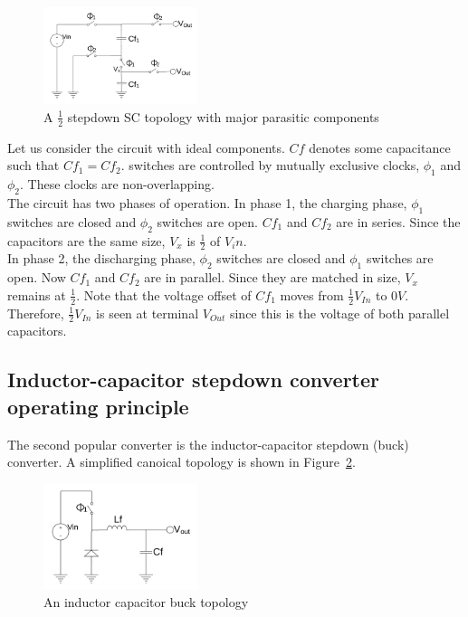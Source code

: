 \documentclass[letterpaper,twocolumn,10pt]{article}
\begin{document}
\begin{figure}[here]
\includegraphics[width=0.4\textwidth]{SCTopology}
\caption{A $\frac{1}{2}$ stepdown SC topology with major parasitic components}
\label{SCTopology}
\end{figure}

Let us consider the circuit with ideal components. $Cf$ denotes some capacitance such that $Cf_1 = Cf_2$. switches are controlled by mutually exclusive clocks, $\phi_1$ and $\phi_2$. These clocks are non-overlapping.\\
The circuit has two phases of operation. In phase 1, the charging phase, $\phi_1$ switches are closed and $\phi_2$ switches are open. $Cf_1$ and $Cf_2$ are in series. Since the capacitors are the same size, $V_x$ is $\frac{1}{2}$ of $V_in$.\\
In phase 2, the discharging phase, $\phi_2$ switches are closed and $\phi_1$ switches are open. Now $Cf_1$ and $Cf_2$ are in parallel. Since they are matched in size, $V_x$ remains at $\frac{1}{2}$. Note that the voltage offset of $Cf_1$ moves from $\frac{1}{2} V_{In}$ to $0V$. Therefore, $\frac{1}{2} V_{In}$ is seen at terminal $V_{Out}$ since this is the voltage of both parallel capacitors.\\

\subsection{Inductor-capacitor stepdown converter operating principle}

The second popular converter is the inductor-capacitor stepdown (buck) converter. A simplified canoical topology is shown in Figure~\ref{BKTopology}.\\
\begin{figure}[here]
\includegraphics[width=0.4\textwidth]{BKTopology}
\caption{An inductor capacitor buck topology}
\label{BKTopology}
\end{figure}
\end{document}
